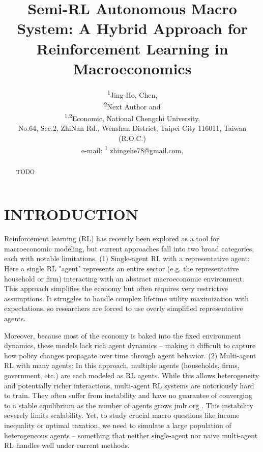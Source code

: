 \documentclass[11pt]{article}
\title{Semi-RL Autonomous Macro System: A Hybrid Approach for Reinforcement Learning in Macroeconomics}
\author{%
    \begin{tabular}{c}
        \textsuperscript{1}Jing-Ho, Chen, \\
        \textsuperscript{2}Next Author and \\[6pt]
        \textsuperscript{1,2}Economic, National Chengchi University, \\
        No.64, Sec.2, ZhiNan Rd., Wenshan District, Taipei City 116011, Taiwan (R.O.C.) \\[6pt]
        e-mail: \textsuperscript{1} zhingehe78@gmail.com, \\
    \end{tabular}%
}
\date{} %
\begin{document}
\maketitle

\begin{abstract}
TODO
\end{abstract}


\section{INTRODUCTION}

Reinforcement learning (RL) has recently been explored as a tool for macroeconomic modeling, but current approaches fall into two broad categories, each with notable limitations. (1) Single-agent RL with a representative agent: Here a single RL "agent" represents an entire sector (e.g. the representative household or firm) interacting with an abstract macroeconomic environment. This approach simplifies the economy but often requires very restrictive assumptions. It struggles to handle complex lifetime utility maximization with expectations, so researchers are forced to use overly simplified representative agents.

Moreover, because most of the economy is baked into the fixed environment dynamics, these models lack rich agent dynamics – making it difficult to capture how policy changes propagate over time through agent behavior. (2) Multi-agent RL with many agents: In this approach, multiple agents (households, firms, government, etc.) are each modeled as RL agents. While this allows heterogeneity and potentially richer interactions, multi-agent RL systems are notoriously hard to train. They often suffer from instability and have no guarantee of converging to a stable equilibrium as the number of agents grows
jmlr.org
. This instability severely limits scalability. Yet, to study crucial macro questions like income inequality or optimal taxation, we need to simulate a large population of heterogeneous agents – something that neither single-agent nor naive multi-agent RL handles well under current methods.
\end{document}
